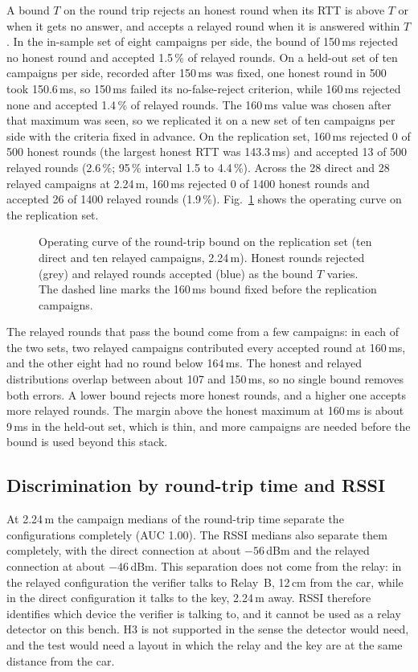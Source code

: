 \documentclass{ieeeaccess}
\begin{document}
A bound $T$ on the round trip rejects an honest round when its RTT is above $T$ or when it gets no answer, and accepts a relayed round when it is answered within $T$. In the in-sample set of eight campaigns per side, the bound of 150\,ms rejected no honest round and accepted 1.5\,\% of relayed rounds. On a held-out set of ten campaigns per side, recorded after 150\,ms was fixed, one honest round in 500 took 150.6\,ms, so 150\,ms failed its no-false-reject criterion, while 160\,ms rejected none and accepted 1.4\,\% of relayed rounds. The 160\,ms value was chosen after that maximum was seen, so we replicated it on a new set of ten campaigns per side with the criteria fixed in advance. On the replication set, 160\,ms rejected 0 of 500 honest rounds (the largest honest RTT was 143.3\,ms) and accepted 13 of 500 relayed rounds (2.6\,\%; 95\,\% interval 1.5 to 4.4\,\%). Across the 28 direct and 28 relayed campaigns at 2.24\,m, 160\,ms rejected 0 of 1400 honest rounds and accepted 26 of 1400 relayed rounds (1.9\,\%). Fig.~\ref{fig:bound} shows the operating curve on the replication set.

\begin{figure}[t]
\centering

\caption{Operating curve of the round-trip bound on the replication set (ten direct and ten relayed campaigns, 2.24\,m). Honest rounds rejected (grey) and relayed rounds accepted (blue) as the bound $T$ varies. The dashed line marks the 160\,ms bound fixed before the replication campaigns.}
\label{fig:bound}
\end{figure}

The relayed rounds that pass the bound come from a few campaigns: in each of the two sets, two relayed campaigns contributed every accepted round at 160\,ms, and the other eight had no round below 164\,ms. The honest and relayed distributions overlap between about 107 and 150\,ms, so no single bound removes both errors. A lower bound rejects more honest rounds, and a higher one accepts more relayed rounds. The margin above the honest maximum at 160\,ms is about 9\,ms in the held-out set, which is thin, and more campaigns are needed before the bound is used beyond this stack.

\subsection{Discrimination by round-trip time and RSSI}
\label{sec:rssi}

At 2.24\,m the campaign medians of the round-trip time separate the configurations completely (AUC 1.00). The RSSI medians also separate them completely, with the direct connection at about $-56$\,dBm and the relayed connection at about $-46$\,dBm. This separation does not come from the relay: in the relayed configuration the verifier talks to Relay~B, 12\,cm from the car, while in the direct configuration it talks to the key, 2.24\,m away. RSSI therefore identifies which device the verifier is talking to, and it cannot be used as a relay detector on this bench. H3 is not supported in the sense the detector would need, and the test would need a layout in which the relay and the key are at the same distance from the car.
\end{document}

